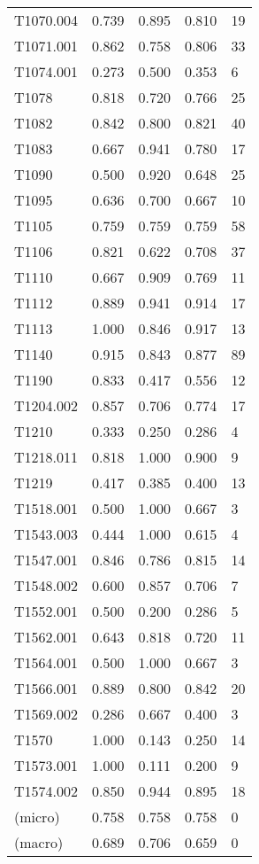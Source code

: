 \begin{tabular}[t]{lrrrl}
    \toprule
    T1070.004  & 0.739 & 0.895 & 0.810 & 19  \\
    T1071.001  & 0.862 & 0.758 & 0.806 & 33  \\
    T1074.001  & 0.273 & 0.500 & 0.353 & 6   \\
    T1078      & 0.818 & 0.720 & 0.766 & 25  \\
    T1082      & 0.842 & 0.800 & 0.821 & 40  \\
    T1083      & 0.667 & 0.941 & 0.780 & 17  \\
    T1090      & 0.500 & 0.920 & 0.648 & 25  \\
    T1095      & 0.636 & 0.700 & 0.667 & 10  \\
    T1105      & 0.759 & 0.759 & 0.759 & 58  \\
    T1106      & 0.821 & 0.622 & 0.708 & 37  \\
    T1110      & 0.667 & 0.909 & 0.769 & 11  \\
    T1112      & 0.889 & 0.941 & 0.914 & 17  \\
    T1113      & 1.000 & 0.846 & 0.917 & 13  \\
    T1140      & 0.915 & 0.843 & 0.877 & 89  \\
    T1190      & 0.833 & 0.417 & 0.556 & 12  \\
    T1204.002  & 0.857 & 0.706 & 0.774 & 17  \\
    T1210      & 0.333 & 0.250 & 0.286 & 4   \\
    T1218.011  & 0.818 & 1.000 & 0.900 & 9   \\
    T1219      & 0.417 & 0.385 & 0.400 & 13  \\
    T1518.001  & 0.500 & 1.000 & 0.667 & 3   \\
    T1543.003  & 0.444 & 1.000 & 0.615 & 4   \\
    T1547.001  & 0.846 & 0.786 & 0.815 & 14  \\
    T1548.002  & 0.600 & 0.857 & 0.706 & 7   \\
    T1552.001  & 0.500 & 0.200 & 0.286 & 5   \\
    T1562.001  & 0.643 & 0.818 & 0.720 & 11  \\
    T1564.001  & 0.500 & 1.000 & 0.667 & 3   \\
    T1566.001  & 0.889 & 0.800 & 0.842 & 20  \\
    T1569.002  & 0.286 & 0.667 & 0.400 & 3   \\
    T1570      & 1.000 & 0.143 & 0.250 & 14  \\
    T1573.001  & 1.000 & 0.111 & 0.200 & 9   \\
    T1574.002  & 0.850 & 0.944 & 0.895 & 18  \\
    \midrule
    (micro)    & 0.758 & 0.758 & 0.758 & 0   \\
    (macro)    & 0.689 & 0.706 & 0.659 & 0   \\
    \bottomrule
\end{tabular}
